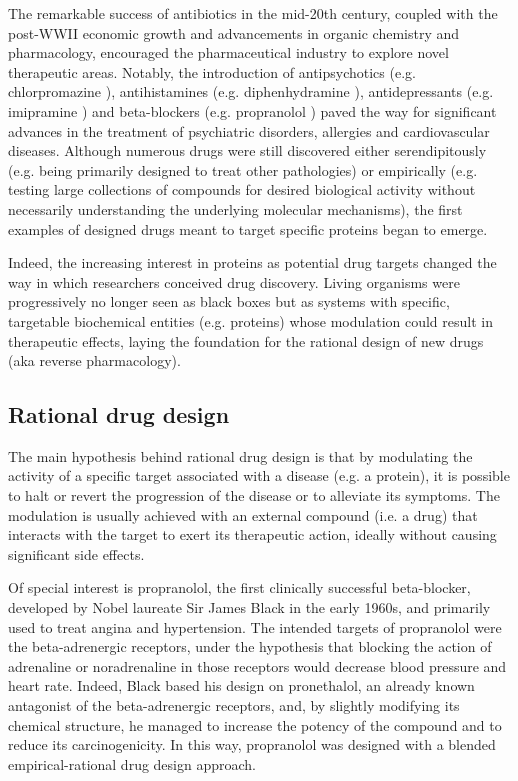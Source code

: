 The remarkable success of antibiotics in the mid-20th century, coupled with the post-WWII economic growth and advancements in organic chemistry and pharmacology, encouraged the pharmaceutical industry to explore novel therapeutic areas. Notably, the introduction of antipsychotics (e.g. chlorpromazine \cite{ban_fifty_2007}), antihistamines (e.g. diphenhydramine \cite{simons_histamine_2011}), antidepressants (e.g. imipramine \cite{brown_clinical_2015}) and beta-blockers (e.g. propranolol \cite{srinivasan_propranolol_2019}) paved the way for significant advances in the treatment of psychiatric disorders, allergies and cardiovascular diseases. Although numerous drugs were still discovered either serendipitously (e.g. being primarily designed to treat other pathologies) or empirically (e.g. testing large collections of compounds for desired biological activity without necessarily understanding the underlying molecular mechanisms), the first examples of designed drugs meant to target specific proteins began to emerge\cite{drews_drug_2000}.

Indeed, the increasing interest in proteins as potential drug targets changed the way in which researchers conceived drug discovery. Living organisms were progressively no longer seen as black boxes but as systems with specific, targetable biochemical entities (e.g. proteins) whose modulation could result in therapeutic effects, laying the foundation for the rational design of new drugs (aka reverse pharmacology). 

\subsection{Rational drug design}
\label{Introduction_rational}

The main hypothesis behind rational drug design is that by modulating the activity of a specific target associated with a disease (e.g. a protein), it is possible to halt or revert the progression of the disease or to alleviate its symptoms. The modulation is usually achieved with an external compound (i.e. a drug) that interacts with the target to exert its therapeutic action, ideally without causing significant side effects.

Of special interest is propranolol, the first clinically successful beta-blocker, developed by Nobel laureate Sir James Black in the early 1960s, and primarily used to treat angina and hypertension\cite{srinivasan_propranolol_2019}. The intended targets of propranolol were the beta-adrenergic receptors, under the hypothesis that blocking the action of adrenaline or noradrenaline in those receptors would decrease blood pressure and heart rate. Indeed, Black based his design on pronethalol, an already known antagonist of the beta-adrenergic receptors, and, by slightly modifying its chemical structure, he managed to increase the potency of the compound and to reduce its carcinogenicity\cite{black_new_1964}. In this way, propranolol was designed with a blended empirical-rational drug design approach.

